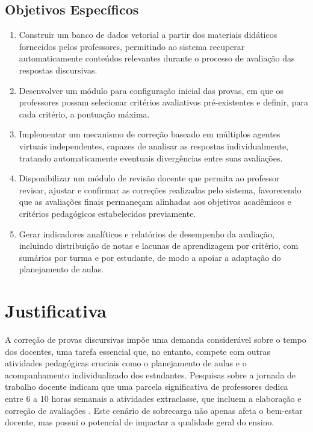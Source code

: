 \subsection{Objetivos Específicos}
\begin{enumerate}
\item Construir um banco de dados vetorial a partir dos materiais didáticos fornecidos pelos professores, permitindo ao sistema recuperar automaticamente conteúdos relevantes durante o processo de avaliação das respostas discursivas. 

\item Desenvolver um módulo para configuração inicial das provas, em que os professores possam selecionar critérios avaliativos pré-existentes e definir, para cada critério, a pontuação máxima.

\item Implementar um mecanismo de correção baseado em múltiplos agentes virtuais independentes, capazes de analisar as respostas individualmente, tratando automaticamente eventuais divergências entre suas avaliações.

\item Disponibilizar um módulo de revisão docente que permita ao professor revisar, ajustar e confirmar as correções realizadas pelo sistema, favorecendo que as avaliações finais permaneçam alinhadas aos objetivos acadêmicos e critérios pedagógicos estabelecidos previamente.

\item Gerar indicadores analíticos e relatórios de desempenho da avaliação, incluindo distribuição de notas e lacunas de aprendizagem por critério, com sumários por turma e por estudante, de modo a apoiar a adaptação do planejamento de aulas.

\end{enumerate}

\section{Justificativa}

A correção de provas discursivas impõe uma demanda considerável sobre o tempo dos docentes, uma tarefa essencial que, no entanto, compete com outras atividades pedagógicas cruciais como o planejamento de aulas e o acompanhamento individualizado dos estudantes. Pesquisas sobre a jornada de trabalho docente indicam que uma parcela significativa de professores dedica entre 6 a 10 horas semanais a atividades extraclasse, que incluem a elaboração e correção de avaliações \cite{barbosa_tempo_2021}. Este cenário de sobrecarga não apenas afeta o bem-estar docente, mas possui o potencial de impactar a qualidade geral do ensino.

